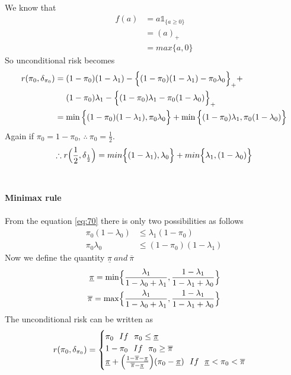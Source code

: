 \documentclass[a4paper,english,12pt]{article}
\begin{document}
\begin{exmp}
\begin{align}
\end{align}
We know that
\begin{align}
f(a)&=a\mathds{1}_{\{a\geq0\}}\nonumber\\
	&=(a)_{+}\nonumber\\
	&=max\{a,0\}
\end{align}
So unconditional risk becomes
\begin{align}
r(\pi_{0},\delta_{\pi_{0}})&=(1-\pi_{0})(1-\lambda_{1})-{\Bigl\{(1-\pi_{0})(1-\lambda_{1})-\pi_{0}\lambda_{0}\Bigr\}}_{+}+\nonumber\\
									  &~~~~(1-\pi_{0})\lambda_{1}-{\Bigl\{(1-\pi_{0})\lambda_{1}-\pi_{0}(1-\lambda_{0})\Bigr\}}_{+}\nonumber\\
									  &=\min{\Bigl\{(1-\pi_{0})(1-\lambda_{1}),\pi_{0}\lambda_{0}\Bigr\}}+\min{\Bigl\{(1-\pi_{0})\lambda_{1},\pi_{0}(1-\lambda_{0})\Bigr\}}\label{eq:70}
\end{align}
Again if $\pi_{0}=1-\pi_{0}$, $\therefore~\pi_{0}=\frac{1}{2}$.
\begin{equation}
\therefore r\Bigl(\frac{1}{2},\delta_{\frac{1}{2}}\Bigr)= min{\Bigl\{(1-\lambda_{1}),\lambda_{0}\Bigr\}}+min{\Bigl\{\lambda_{1},(1-\lambda_{0})\Bigr\}}
\end{equation}
\\\\
\textbf{Minimax rule}\\\\
From the equation \ref{eq:70} there is only two possibilities as follows
\begin{align}
\pi_{0}(1-\lambda_{0})&\leq\lambda_{1}(1-\pi_{0})\\
\pi_{0}\lambda_{0}&\leq(1-\pi_{0})(1-\lambda_{1})
\end{align}
Now we define the quantity $\underline{\pi}~and~\overline{\pi}$ 
\begin{eqnarray}
\underline{\pi}=\min\Bigl\{\frac{\lambda_{1}}{1-\lambda_{0}+\lambda_{1}},\frac{1-\lambda_{1}}{1-\lambda_{1}+\lambda_{0}}\Bigr\}\nonumber\\
\overline{\pi}=\max\Bigl\{\frac{\lambda_{1}}{1-\lambda_{0}+\lambda_{1}},\frac{1-\lambda_{1}}{1-\lambda_{1}+\lambda_{0}}\Bigr\}\nonumber
\end{eqnarray}
The unconditional risk can be written as
\begin{equation}
r(\pi_0,\delta_{\pi_0})= \begin{cases} \pi_0~~ If~~ \pi_0\leq\underline{\pi}\\
 						1-\pi_0 ~~If ~~\pi_0\geq\overline{\pi}  \\
  						\underline{\pi}+\Bigl(\frac{1-\overline{\pi}-\underline{\pi}}{\overline{\pi}-\underline{\pi}}\Bigr)
(\pi_0-\underline{\pi})~~If ~~\underline{\pi}<\pi_0<\overline{\pi}
\end{cases}
\end{equation}


\end{exmp}
\end{document}

